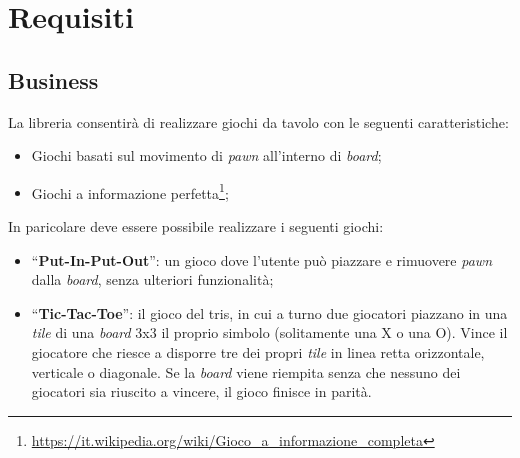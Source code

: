 \section{Requisiti}




\subsection{Business}

La libreria consentirà di realizzare giochi da tavolo con le seguenti caratteristiche:

\begin{itemize}
    \item Giochi basati sul movimento di \textit{pawn} all'interno di \textit{board};
    \item Giochi a informazione perfetta\footnote{\url{https://it.wikipedia.org/wiki/Gioco_a_informazione_completa}};
\end{itemize}

In paricolare deve essere possibile realizzare i seguenti giochi:

\begin{itemize}
    \item ``\textbf{Put-In-Put-Out}'': un gioco dove l'utente può piazzare e rimuovere \textit{pawn} dalla \textit{board}, senza ulteriori funzionalità;
    \item ``\textbf{Tic-Tac-Toe}'': il gioco del tris, in cui a turno due giocatori piazzano in una \textit{tile} di una \textit{board} 3x3 il proprio simbolo (solitamente una X o una O). Vince il giocatore che riesce a disporre tre dei propri \textit{tile} in linea retta orizzontale, verticale o diagonale. Se la \textit{board} viene riempita senza che nessuno dei giocatori sia riuscito a vincere, il gioco finisce in parità.
\end{itemize}

